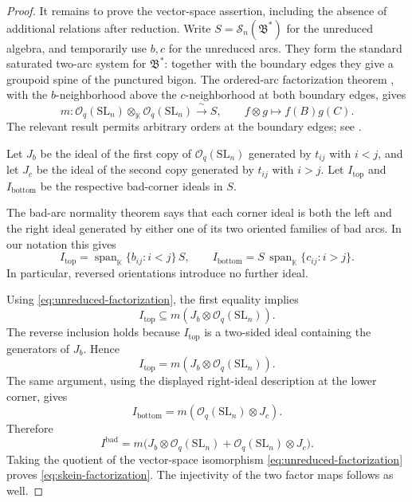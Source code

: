 \documentclass[11pt]{article}
\theoremstyle{remark}
\newcommand{\kk}{\mathbb{K}}
\newcommand{\OO}{\mathcal O_q(\mathrm{SL}_n)}
\newcommand{\Sk}{\mathscr S_n}
\newcommand{\Bstar}{\mathfrak B^{*}}
\DeclareMathOperator{\Span}{span}
\begin{document}
\begin{proof}
It remains to prove the vector-space assertion, including the
absence of additional relations after reduction.
Write $S=\Sk(\Bstar)$ for the unreduced algebra, and temporarily
use $b,c$ for the unreduced arcs.  They form the standard saturated 
two-arc system for $\Bstar$: together with the boundary edges they
give a groupoid spine of the punctured bigon.  The ordered-arc
factorization theorem , with the $b$-neighborhood above the
$c$-neighborhood at both boundary edges, gives 
\begin{equation}\label{eq:unreduced-factorization}
 m:\OO\otimes_\kk\OO\xrightarrow{\ \sim\ }S,\qquad
 f\otimes g\longmapsto f(B)g(C).
\end{equation}
The relevant result permits arbitrary orders at the boundary
edges; see \cite[Corollary~8.14]{LS}.


Let $J_b$ be the ideal of the first copy of $\OO$ generated by
$t_{ij}$ with $i<j$, and let $J_c$ be the ideal of the second copy
generated by $t_{ij}$ with $i>j$.
Let $I_{\mathrm{top}}$ and $I_{\mathrm{bottom}}$ be the respective
bad-corner ideals in $S$.

The bad-arc normality theorem
\cite[Theorem~7.2, especially Equation~(128)]{LY} says that each
corner ideal is both the left and the right ideal generated by
either one of its two oriented families of bad arcs.  In our
notation this gives
\[
 I_{\mathrm{top}}
   =\Span_\kk\{b_{ij}:i<j\}\,S,
 \qquad
 I_{\mathrm{bottom}}
   =S\,\Span_\kk\{c_{ij}:i>j\}.
\]
In particular, reversed orientations introduce no further ideal.


Using \eqref{eq:unreduced-factorization}, the first equality implies
\[
 I_{\mathrm{top}}\subseteq m(J_b\otimes\OO).
\]
The reverse inclusion holds because $I_{\mathrm{top}}$ is a
two-sided ideal containing the generators of $J_b$.  Hence
\[
 I_{\mathrm{top}}=m(J_b\otimes\OO).
\]
The same argument, using the displayed right-ideal description at
the lower corner, gives
\[
 I_{\mathrm{bottom}}=m(\OO\otimes J_c).
\]
Therefore
\[
 I^{\mathrm{bad}}
   =m\bigl(J_b\otimes\OO+\OO\otimes J_c\bigr).
\]
Taking the quotient of the vector-space isomorphism
\eqref{eq:unreduced-factorization} proves
\eqref{eq:skein-factorization}.  The injectivity of the two factor
maps follows as well.
\end{proof}
\end{document}
